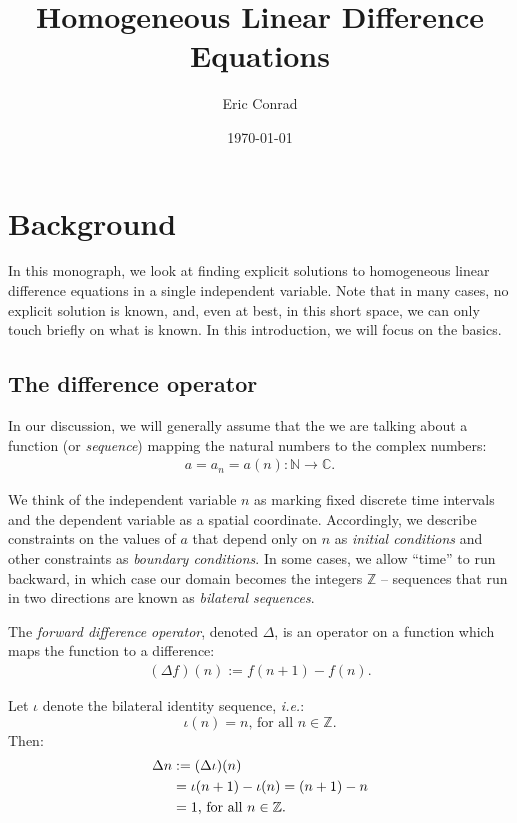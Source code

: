 \documentclass[12pt,letterpaper,reqno]{amsart}
\title{Homogeneous Linear Difference Equations}
\author{Eric Conrad}
\date{\today}
\numberwithin{equation}{section}
\numberwithin{theorem}{section}
\numberwithin{table}{section}
\begin{document}
\maketitle
\tableofcontents
\listoffigures
\listoftables

\section{Background}

In this monograph, we look at finding explicit solutions to homogeneous linear difference equations in a single independent variable.  Note that in many cases, no explicit solution is known, and, even at best, in this short space, we can only touch briefly on what is known.  In this introduction, we will focus on the basics.

\subsection{The difference operator}

In our discussion, we will generally assume that the we are talking about a function (or \emph{sequence}) mapping the natural numbers to the complex numbers:
\begin{align}
	a = {a_n = a(n) : \mathbb{N} \rightarrow \mathbb{C}}\text{.}
\end{align}

We think of the independent variable $n$ as marking fixed discrete time intervals and the dependent variable as a spatial coordinate.  Accordingly, we describe constraints on the values of $a$ that depend only on $n$ as \emph{initial conditions} and other constraints as \emph{boundary conditions}.  In some cases, we allow ``time'' to run backward, in which case our domain becomes the integers $\mathbb{Z}$ -- sequences that run in two directions are known as \emph{bilateral sequences}.

The \emph{forward difference operator}, denoted $\Delta$, is an operator on a function which maps the function to a difference:
\begin{align}
	(\Delta f)(n) := f(n+1) - f(n)\text{.}
\end{align}

Let $\iota$ denote the bilateral identity sequence, \emph{i.e.}:
\[
	\iota(n) = n\text{, for all $n\in\mathbb{Z}$.}
\]
Then:
\begin{align}
	\Delta n &:= (\Delta \iota)(n) \\
			\notag
			& = \iota(n+1) - \iota(n) = (n+1) - n \\
			& = 1 \text{, for all $n\in\mathbb{Z}$.}
\end{align}
\end{document}
